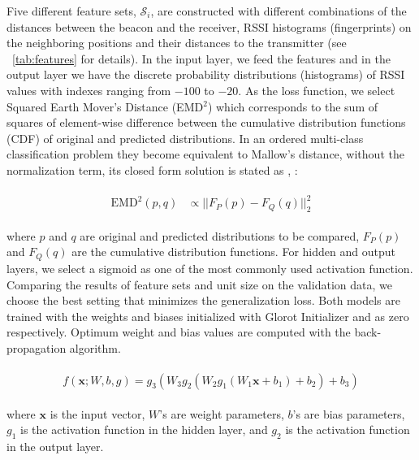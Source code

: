 \documentclass{article}
\newcommand{\x}{\mathbf{x}}
\begin{document}
	Five different feature sets, $\mathcal{S}_i$, are constructed with different combinations of the distances between the beacon and the receiver, RSSI histograms (fingerprints) on the neighboring positions and their distances to the transmitter (see \tablename{~\ref{tab:features}} for details). In the input layer, we feed the features and in the output layer we have the discrete probability distributions (histograms) of RSSI values with indexes ranging from $-100$ to $-20$. 
	As the loss function, we select Squared Earth Mover's Distance (EMD$^2$)\cite{Rub2000} which corresponds to the sum of squares of element-wise difference between the cumulative distribution functions (CDF) of original and predicted distributions. In an ordered multi-class classification problem they become equivalent to Mallow's distance, without the normalization term, its closed form solution is stated as \cite{conf/iccv/LevinaB01}, \cite{Hou2016}:
	\begin{small}
		\begin{align}
		\begin{split}
		\text{EMD}^2(p, q) &\propto || F_P(p) - F_Q(q)||^2_2 \end{split}
		\end{align}
	\end{small}
	where $p$ and $q$ are original and predicted distributions to be compared, $F_P(p)$ and $F_Q(q)$ are the cumulative distribution functions. For hidden and output layers, we select a sigmoid as one of the most commonly used activation function. Comparing the results of feature sets and unit size on the validation data, we choose the best setting that minimizes the generalization loss. Both models are trained with the weights and biases initialized with Glorot Initializer \cite{Glo2010} and as zero respectively. Optimum weight and bias values are computed with the back-propagation algorithm. 
	\begin{small}
	\begin{align}
		\begin{split}
			f(\x; W, b, g) = g_3(W_3 g_2(W_2 g_1(W_1 \x + b_1) + b_2) + b_3)
		\end{split}
		\label{eq:model}
	\end{align}
	\end{small}
where $\x$ is the input vector, $W$'s are weight parameters, $b$'s are bias parameters, $g_1$ is the activation function in the hidden layer, and $g_2$ is the activation function in the output layer.
\end{document}
